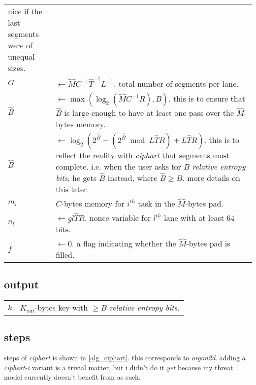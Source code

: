 \documentclass[twocolumn]{article}
\DeclareMathOperator{\maxf}{max}
\begin{document}
\begin{tabularx}{\columnwidth}{lX}
                    nice if the last segments were of unequal sizes.\\
    $G$         & $\gets \hat MC^{-1}\hat T^{-1}L^{-1}$.  total number of
                    segments per lane.\\
    $\hat B$    & $\gets \maxf(\log_2(\hat MC^{-1}R), B)$.  this is to ensure
                    that $\hat B$ is large enough to have at least one pass
                    over the $\hat M$-bytes memory.\\
    $\hat B$    & $\gets \log_2(2^{\hat B} - (2^{\hat B} \bmod L\hat TR) +
                    L\hat TR)$.  this is to reflect the reality with
                    \emph{ciphart} that segments must complete.  i.e. when
                    the user asks for $B$ \emph{relative entropy bits}, he
                    gets $\hat B$ instead, where $\hat B \ge B$.  more
                    details on this later.\\
    $m_i$       & $C$-bytes memory for $i^{th}$ task in the $\hat M$-bytes
                    pad.\\
    $n_l$       & $\gets gl\hat TR$.  nonce variable for $l^{th}$ lane with
                    at least $64$ bits.\\
    $f$         & $\gets 0$.  a flag indicating whether the $\hat M$-bytes
                    pad is filled.\\
\end{tabularx}

\subsection{output}
\begin{tabular}{ll}
$k$ & $K_{\text{out}}$-bytes key with $\ge B$ \emph{relative entropy
        bits}.\\
\end{tabular}

\subsection{steps}
steps of \emph{ciphart} is shown in \cref{alg_ciphart}.  this corresponds
to \emph{argon2d}.  adding a \emph{ciphart-i} variant is a trivial matter,
but i didn't do it \emph{yet} because my threat model currently doesn't
benefit from as such.
\end{document}
